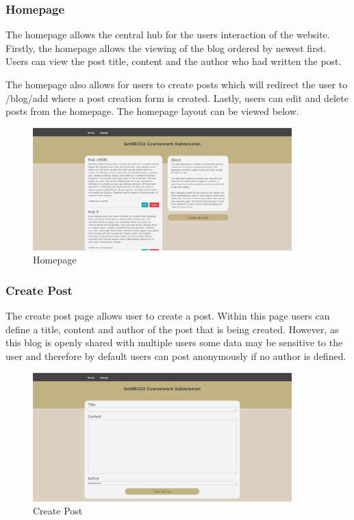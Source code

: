 \documentclass[10pt, a4paper]{article}
\begin{document}
\subsubsection{Homepage}
    The homepage allows the central hub for the users interaction of the website.  Firstly, the homepage allows the viewing of the blog ordered by newest first.  Users can view the post title, content and the author who had written the post. 

The homepage also allows for users to create posts which will redirect the user to /blog/add where a post creation form is created.  Lastly, users can edit and delete posts from the homepage. The homepage layout can be viewed below.
\begin{figure}[H]
  	  \centering
   	 \includegraphics[width=100mm]{images/homepage.png}
    	\caption{Homepage}
    \end{figure} 
\subsubsection{Create Post}
The create post page allows user to create a post.  Within this page users can define a title, content and author of the post that is being created.  However, as this blog is openly shared with multiple users some data may be sensitive to the user and therefore by default users can post anonymously if no author is defined. 
\begin{figure}[H]
  	  \centering
   	 \includegraphics[width=100mm]{images/create.png}
    	\caption{Create Post}
 \end{figure} 
\end{document}
